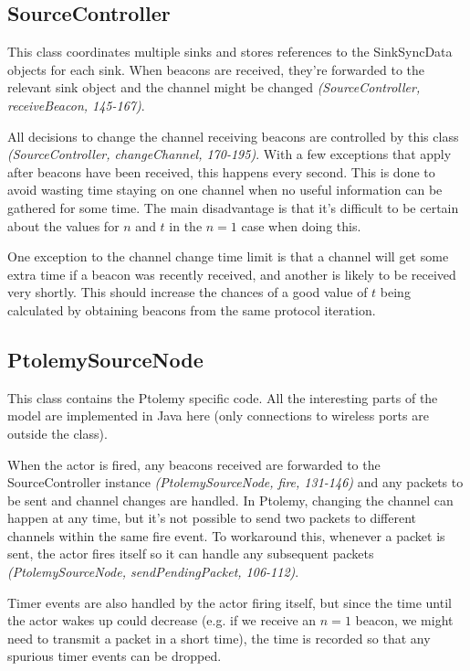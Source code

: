 \documentclass[a4paper,12pt,DIV=calc]{scrartcl}
\newcommand{\coderef}[3]{\emph{(#1, #2, #3)}}
\begin{document}
\subsection{SourceController}
This class coordinates multiple sinks and stores references to the SinkSyncData
objects for each sink.  When beacons are received, they're forwarded to the
relevant sink object and the channel might be changed
\coderef{SourceController}{receiveBeacon}{145-167}.

All decisions to change the channel receiving beacons are controlled by this
class \coderef{SourceController}{changeChannel}{170-195}. With a few exceptions
that apply after beacons have been received, this happens every second. This is
done to avoid wasting time staying on one channel when no useful information
can be gathered for some time. The main disadvantage is that it's difficult to
be certain about the values for $n$ and $t$ in the $n = 1$ case when doing this.

One exception to the channel change time limit is that a channel will get some
extra time if a beacon was recently received, and another is likely to be
received very shortly. This should increase the chances of a good value of $t$
being calculated by obtaining beacons from the same protocol iteration.

\subsection{PtolemySourceNode}
This class contains the Ptolemy specific code. All the interesting parts of the
model are implemented in Java here (only connections to wireless ports are
outside the class).

When the actor is fired, any beacons received are forwarded to the
SourceController instance \coderef{PtolemySourceNode}{fire}{131-146} and any
packets to be sent and channel changes are handled. In Ptolemy, changing the
channel can happen at any time, but it's not possible to send two packets to
different channels within the same fire event. To workaround this, whenever a
packet is sent, the actor fires itself so it can handle any subsequent packets
\coderef{PtolemySourceNode}{sendPendingPacket}{106-112}.

Timer events are also handled by the actor firing itself, but since the time
until the actor wakes up could decrease (e.g. if we receive an $n = 1$ beacon,
we might need to transmit a packet in a short time), the time is recorded so
that any spurious timer events can be dropped.
\end{document}
